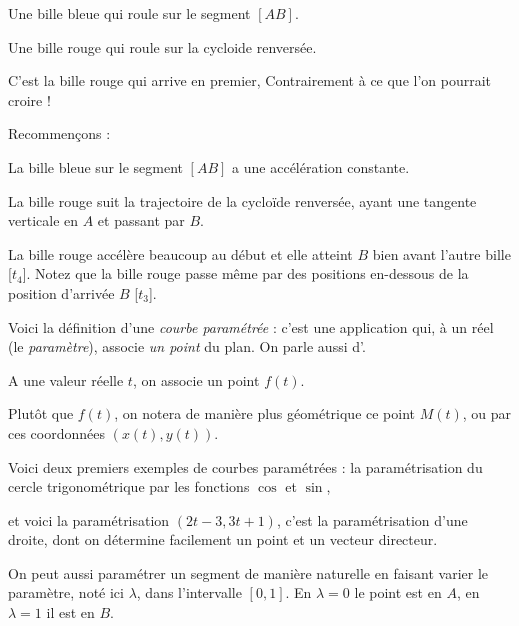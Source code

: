Une bille bleue qui roule sur le segment $[AB]$.

Une bille rouge qui roule sur la cycloide renversée.

\change

\change

\change

\change
C'est la bille rouge qui arrive en premier,
Contrairement à ce que l'on pourrait croire !


Recommençons :

\change

\change

\change

\change



La bille bleue sur le segment $[AB]$ a une accélération constante.

La bille rouge suit la trajectoire de la cycloïde renversée, 
ayant une tangente verticale en $A$ et passant par $B$.

La bille rouge accélère beaucoup au début et elle atteint $B$ bien avant l'autre bille 
[$t_4$].
Notez que la bille rouge passe même par des positions en-dessous de la position d'arrivée $B$ [$t_3$].



\diapo


Voici la définition d'une \emph{courbe paramétrée} : c'est une application qui, 
à un réel (le \emph{paramètre}), associe \emph{un point} du plan. 
On parle aussi d'.

\change
A une valeur réelle $t$, on associe un point $f(t)$.

Plutôt que $f(t)$, on notera de manière plus géométrique ce point $M(t)$,
ou par ces coordonnées $(x(t),y(t))$.



\diapo

Voici deux premiers exemples de courbes paramétrées : 
la paramétrisation du cercle trigonométrique par les 
fonctions $\cos$ et $\sin$, 

\change
et voici la paramétrisation $(2t-3,3t+1)$, c'est la paramétrisation d'une
droite, dont on détermine facilement un point et un vecteur directeur.

\diapo

On peut aussi paramétrer un segment de manière naturelle 
en faisant varier le paramètre, noté ici $\lambda$, 
dans l'intervalle $[0,1]$. 
En $\lambda=0$ le point est en $A$, en $\lambda=1$ il est en $B$.

